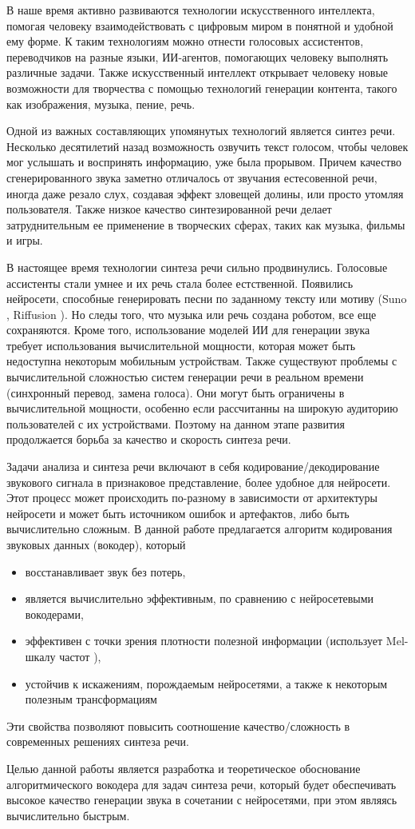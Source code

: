 \Introduction

В наше время активно развиваются технологии искусственного интеллекта, помогая человеку взаимодействовать с цифровым миром в понятной и удобной ему форме. 
К таким технологиям можно отнести голосовых ассистентов, переводчиков на разные языки, ИИ-агентов, помогающих человеку выполнять различные задачи.
Также искусственный интеллект открывает человеку новые возможности для творчества с помощью технологий генерации контента, такого как изображения, музыка, пение, речь.

Одной из важных составляющих упомянутых технологий является синтез речи. 
Несколько десятилетий назад возможность озвучить текст голосом, чтобы человек мог услышать и воспринять информацию, уже была прорывом. 
Причем качество сгенерированного звука заметно отличалось от звучания естесовенной речи, иногда даже резало слух, создавая эффект зловещей долины, или просто утомляя пользователя.
Также низкое качество синтезированной речи делает затруднительным ее применение в творческих сферах, таких как музыка, фильмы и игры.

В настоящее время технологии синтеза речи сильно продвинулись. Голосовые ассистенты стали умнее и их речь стала более естственной. 
Появились нейросети, способные генерировать песни по заданному тексту или мотиву (Suno \cite{SunoAI_Bark_2023}, Riffusion \cite{Riffusion}). 
Но следы того, что музыка или речь создана роботом, все еще сохраняются.
Кроме того, использование моделей ИИ для генерации звука требует использования вычислительной мощности, которая может быть недоступна некоторым мобильным устройствам.
Также существуют проблемы с вычислительной сложностью систем генерации речи в реальном времени (синхронный перевод, замена голоса). 
Они могут быть ограничены в вычислительной мощности, особенно если рассчитанны на широкую аудиторию пользователей с их устройствами.
Поэтому на данном этапе развития продолжается борьба за качество и скорость синтеза речи.

Задачи анализа и синтеза речи включают в себя кодирование/декодирование звукового сигнала в признаковое представление, более удобное для нейросети.
Этот процесс может происходить по-разному в зависимости от архитектуры нейросети и может быть источником ошибок и артефактов, либо быть вычислительно сложным.
В данной работе предлагается алгоритм кодирования звуковых данных (вокодер), который 
\begin{itemize}
    \item восстанавливает звук без потерь, 
    \item является вычислительно эффективным, по сравнению с нейросетевыми вокодерами,
    \item эффективен с точки зрения плотности полезной информации (использует Mel-шкалу частот \cite{MelScale}),
    \item устойчив к искажениям, порождаемым нейросетями, а также к некоторым полезным трансформациям
\end{itemize}
Эти свойства позволяют повысить соотношение качество/сложность в современных решениях синтеза речи.

Целью данной работы является разработка и теоретическое обоснование алгоритмического вокодера для задач синтеза речи, который будет обеспечивать высокое качество генерации звука в сочетании с нейросетями, при этом являясь вычислительно быстрым.
